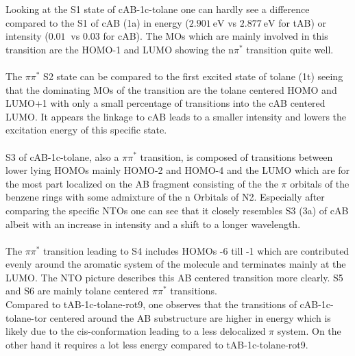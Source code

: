 %
%
\begin{comment}
Table \ref{tab:excited_states_cAB_1c_tolane} contains the wavelength, energy and oscillator strength of the six energetically lowest excited states of cAB-1c-tolane which are plotted in figure \ref{fig:UV_spec_cAB-for-tAB-1c-tolan} in relation to a combined UV spectrum of cAB and tolane. \\
\\  
\end{comment}
%
Looking at the S1 state of cAB-1c-tolane one can hardly see a difference compared to the S1 of cAB (1a) in energy ($\SI{2.901}{\eV}$ vs $\SI{2.877}{\eV}$ for tAB) or intensity ($\SI{0.01}{}$ vs $0.03$ for cAB). The MOs which are mainly involved in this transition are the HOMO-1 and LUMO showing the n$\pi^{*}$ transition quite well. \\
\\
The $\pi\pi^{*}$ S2 state can be compared to the first excited state of tolane (1t) seeing that the dominating MOs of the transition are the tolane centered HOMO and LUMO+1 with only a small percentage of transitions into the cAB centered LUMO. It appears the linkage to cAB leads to a smaller intensity and lowers the excitation energy of this specific state. \\
\\
S3 of cAB-1c-tolane, also a $\pi\pi^{*}$ transition, is composed of transitions between lower lying HOMOs mainly HOMO-2 and HOMO-4 and the LUMO which are for the most part localized on the AB fragment consisting of the the $\pi$ orbitals of the benzene rings with some admixture of the n Orbitals of N2. Especially after comparing the specific NTOs one can see that it closely resembles S3 (3a) of cAB albeit with an increase in intensity and a shift to a longer wavelength. \\
\\
The $\pi\pi^{*}$ transition leading to S4 includes HOMOs -6 till -1 which are contributed evenly around the aromatic system of the molecule and terminates mainly at the LUMO. The NTO picture describes this AB centered transition more clearly. S5 and S6 are mainly tolane centered $\pi\pi^{*}$ transitions. \\
Compared to tAB-1c-tolane-rot9, one observes that the transitions of cAB-1c-tolane-tor centered around the AB substructure are higher in energy which is likely due to the cis-conformation leading to a less delocalized $\pi$ system. On the other hand it requires a lot less energy compared to tAB-1c-tolane-rot9.
%
%
%
%
%

